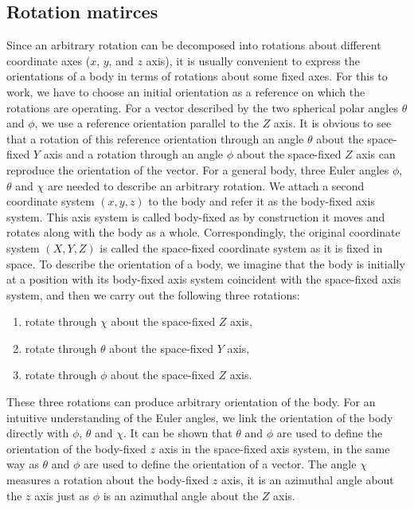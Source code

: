 \subsection{Rotation matirces}

Since an arbitrary rotation can be decomposed into rotations about different coordinate axes ($x$, $y$, and $z$ axis), 
it is usually convenient to express the orientations of a body in terms of rotations about some fixed axes. For this to 
work, we have to choose an initial orientation as a reference on which the rotations are operating. 
For a vector described by the two spherical polar angles $\theta$ and $\phi$, we use a reference orientation parallel 
to the $Z$ axis. It is obvious to see that a rotation of this reference orientation through an angle $\theta$ about 
the space-fixed $Y$ axis and a rotation through an angle $\phi$ about the space-fixed $Z$ axis can reproduce the 
orientation of the vector. For a general body, three Euler angles $\phi$, $\theta$ and $\chi$ are needed to
 describe an arbitrary rotation.
We attach a second coordinate system 
$(x, y, z)$ to the body and refer it as the body-fixed axis system. This axis system is called 
body-fixed as by construction it moves and rotates along with the body as a whole. 
Correspondingly, the original coordinate system $(X, Y, Z)$ is called the space-fixed coordinate system as it is fixed in 
space. 
To describe the orientation of a body, we imagine that the body is initially at a position with its body-fixed axis system
 coincident with the space-fixed axis system, and then we carry out the following three rotations:
\begin{enumerate}
  \item rotate through $\chi$ about the space-fixed $Z$ axis, 
  \item  rotate through $\theta$ about the space-fixed $Y$ axis,
  \item  rotate through $\phi$ about the space-fixed $Z$ axis. 
\end{enumerate}
These three rotations can produce arbitrary orientation of the body. For an intuitive understanding of the Euler 
angles, we link the orientation of the body directly with $\phi$, $\theta$ and $\chi$. It can be shown that $\theta$ and
$\phi$ are used to define the orientation of the body-fixed $z$ axis in the space-fixed axis system,  in the same way as
$\theta$ and $\phi$ are used to define the orientation of a vector. The angle $\chi$ measures a rotation about the 
body-fixed $z$ axis, it is an azimuthal angle about the $z$ axis just as $\phi$ is an azimuthal angle about the $Z$ axis. 

